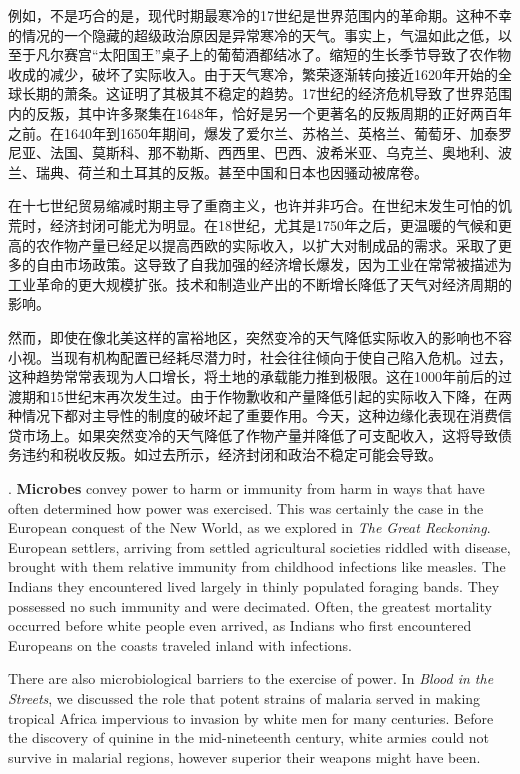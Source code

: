 \begin{paracol}{2}
例如，不是巧合的是，现代时期最寒冷的17世纪是世界范围内的革命期。这种不幸的情况的一个隐藏的超级政治原因是异常寒冷的天气。事实上，气温如此之低，以至于凡尔赛宫“太阳国王”桌子上的葡萄酒都结冰了。缩短的生长季节导致了农作物收成的减少，破坏了实际收入。由于天气寒冷，繁荣逐渐转向接近1620年开始的全球长期的萧条。这证明了其极其不稳定的趋势。17世纪的经济危机导致了世界范围内的反叛，其中许多聚集在1648年，恰好是另一个更著名的反叛周期的正好两百年之前。在1640年到1650年期间，爆发了爱尔兰、苏格兰、英格兰、葡萄牙、加泰罗尼亚、法国、莫斯科、那不勒斯、西西里、巴西、波希米亚、乌克兰、奥地利、波兰、瑞典、荷兰和土耳其的反叛。甚至中国和日本也因骚动被席卷。

在十七世纪贸易缩减时期主导了重商主义，也许并非巧合。在世纪末发生可怕的饥荒时，经济封闭可能尤为明显。在18世纪，尤其是1750年之后，更温暖的气候和更高的农作物产量已经足以提高西欧的实际收入，以扩大对制成品的需求。采取了更多的自由市场政策。这导致了自我加强的经济增长爆发，因为工业在常常被描述为工业革命的更大规模扩张。技术和制造业产出的不断增长降低了天气对经济周期的影响。

然而，即使在像北美这样的富裕地区，突然变冷的天气降低实际收入的影响也不容小视。当现有机构配置已经耗尽潜力时，社会往往倾向于使自己陷入危机。过去，这种趋势常常表现为人口增长，将土地的承载能力推到极限。这在1000年前后的过渡期和15世纪末再次发生过。由于作物歉收和产量降低引起的实际收入下降，在两种情况下都对主导性的制度的破坏起了重要作用。今天，这种边缘化表现在消费信贷市场上。如果突然变冷的天气降低了作物产量并降低了可支配收入，这将导致债务违约和税收反叛。如过去所示，经济封闭和政治不稳定可能会导致。
    
. \textbf{Microbes} convey power to harm or immunity from harm in ways that have often determined how power was exercised. This was certainly the case in the European conquest of the New World, as we explored in \emph{The Great Reckoning}. European settlers, arriving from settled agricultural societies riddled with disease, brought with them relative immunity from childhood infections like measles. The Indians they encountered lived largely in thinly populated foraging bands. They possessed no such immunity and were decimated. Often, the greatest mortality occurred before white people even arrived, as Indians who first encountered Europeans on the coasts traveled inland with infections.

There are also microbiological barriers to the exercise of power. In \emph{Blood in the Streets}, we discussed the role that potent strains of malaria served in making tropical Africa impervious to invasion by white men for many centuries. Before the discovery of quinine in the mid-nineteenth century, white armies could not survive in malarial regions, however superior their weapons might have been.


\end{paracol}
